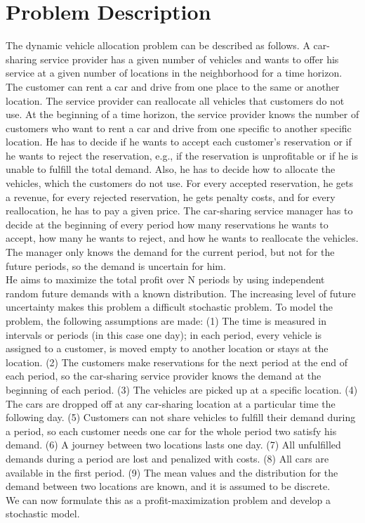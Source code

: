 \section{Problem Description}
The dynamic vehicle allocation problem can be described as follows. A car-sharing service provider has a given number of vehicles and wants to offer his service at a given number of locations in the neighborhood for a time horizon. The customer can rent a car and drive from one place to the same or another location. The service provider can reallocate all vehicles that customers do not use. At the beginning of a time horizon, the service provider knows the number of customers who want to rent a car and drive from one specific to another specific location. He has to decide if he wants to accept each customer's reservation or if he wants to reject the reservation, e.g., if the reservation is unprofitable or if he is unable to fulfill the total demand. Also, he has to decide how to allocate the vehicles, which the customers do not use. For every accepted reservation, he gets a revenue, for every rejected reservation, he gets penalty costs, and for every reallocation, he has to pay a given price.
The car-sharing service manager has to decide at the beginning of every period how many reservations he wants to accept, how many he wants to reject, and how he wants to reallocate the vehicles.
The manager only knows the demand for the current period, but not for the future periods, so the demand is uncertain for him.\\
He aims to maximize the total profit over N periods by using independent random future demands with a known distribution. The increasing level of future uncertainty makes this problem a difficult stochastic problem. To model the problem, the following assumptions are made: (1) The time is measured in intervals or periods (in this case one day); in each period, every vehicle is assigned to a customer, is moved empty to another location or stays at the location. (2) The customers make reservations for the next period at the end of each period, so the car-sharing service provider knows the demand at the beginning of each period. (3) The vehicles are picked up at a specific location. (4) The cars are dropped off at any car-sharing location at a particular time the following day. (5) Customers can not share vehicles to fulfill their demand during a period, so each customer needs one car for the whole period two satisfy his demand. (6) A journey between two locations lasts one day. (7) All unfulfilled demands during a period are lost and penalized with costs. (8) All cars are available in the first period. (9) The mean values and the distribution for the demand between two locations are known, and it is assumed to be discrete.\\
We can now formulate this as a profit-maximization problem and develop a stochastic model.